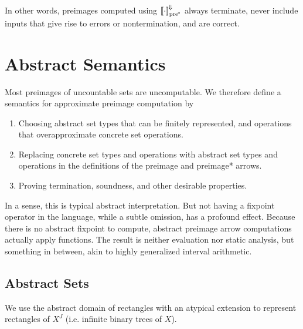 \documentclass{llncs}
\newcommand{\conv}{^{\mspace{-2mu}\Downarrow\mspace{-2mu}}}
\newcommand{\meaningofconv}[1]{\left\llbracket{#1}\right\rrbracket\conv}
\newcommand{\ppre}{_\mathrm{pre^{\mspace{-2mu}*}}}
\begin{document}
In other words, preimages computed using $\meaningofconv{\cdot}\ppre$ always terminate, never include inputs that give rise to errors or nontermination, and are correct.


\section{Abstract Semantics}
\label{sec:abstract-semantics}

Most preimages of uncountable sets are uncomputable.
We therefore define a semantics for approximate preimage computation by
\begin{enumerate}
	\item Choosing abstract set types that can be finitely represented, and operations that overapproximate concrete set operations.
	\item Replacing concrete set types and operations with abstract set types and operations in the definitions of the preimage and preimage* arrows.
	\item Proving termination, soundness, and other desirable properties.
\end{enumerate}
In a sense, this is typical abstract interpretation.
But not having a fixpoint operator in the language, while a subtle omission, has a profound effect.
Because there is no abstract fixpoint to compute, abstract preimage arrow computations actually apply functions.
The result is neither evaluation nor static analysis, but something in between, akin to highly generalized interval arithmetic.

\subsection{Abstract Sets}

We use the abstract domain of rectangles with an atypical extension to represent rectangles of $X^J$ (i.e. infinite binary trees of $X$).
\end{document}
